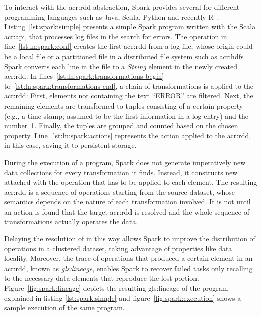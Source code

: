 To interact with the \acrshort{acr:rdd} abstraction, Spark provides several  for different programming languages such as Java, Scala, Python and recently R~\cite{Venkataraman2016}. Listing~\ref{lst:spark:simple} presents a simple Spark program written with the Scala \acrshort{acr:api}, that processes log files in the search for errors. The operation in line~\ref{lst:ln:spark:conf} creates the first \acrshort{acr:rdd} from a log file, whose origin could be a local file or a partitioned file in a distributed file system such as \acrfull{acr:hdfs}~\cite{WebHadoop2017}. Spark converts each line in the file to a \textit{String} element in the newly created \acrshort{acr:rdd}. In lines~\ref{lst:ln:spark:transformations-begin} to~\ref{lst:ln:spark:transformations-end}, a chain of transformations is applied to the \acrshort{acr:rdd}: First, elements not containing the text ``ERROR'' are filtered. Next, the remaining elements are transformed to tuples consisting of a certain property (e.g., a time stamp; assumed to be the first information in a log entry) and the number~1. Finally, the tuples are grouped and counted based on the chosen property. Line~\ref{lst:ln:spark:actions} represents the action applied to the \acrshort{acr:rdd}, in this case, saving it to persistent storage.

During the execution of a program, Spark does not generate imperatively new data collections for every transformation it finds. Instead, it constructs new  attached with the operation that has to be applied to each element. The resulting \acrshort{acr:rdd} is a sequence of operations starting from the source dataset, whose semantics depends on the nature of each transformation involved. It is not until an action is found that the target \acrshort{acr:rdd} is resolved and the whole sequence of transformations actually operates the data. 

Delaying the resolution of  in this way allows Spark to improve the distribution of operations in a clustered dataset, taking advantage of properties like data locality. Moreover, the trace of operations that produced a certain element in an \acrshort{acr:rdd}, known as \textit{\gls{gls:lineage}}, enables Spark to recover failed tasks only recalling to the necessary data elements that reproduce the lost portion. Figure~\ref{fig:spark:lineage} depicts the resulting \gls{gls:lineage} of the program explained in listing \ref{lst:spark:simple} and figure~\ref{fig:spark:execution} shows a sample execution of the same program.

